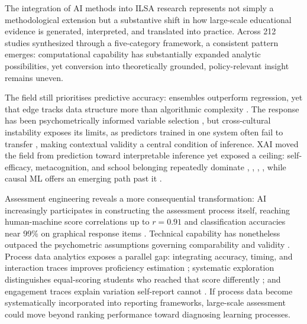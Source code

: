 \documentclass{ieeeaccess}
\begin{document}
The integration of AI methods into ILSA research represents not simply a methodological extension but a substantive shift in how large-scale educational evidence is generated, interpreted, and translated into practice. Across 212 studies synthesized through a five-category framework, a consistent pattern emerges: computational capability has substantially expanded analytic possibilities, yet conversion into theoretically grounded, policy-relevant insight remains uneven.

The field still prioritises predictive accuracy: ensembles outperform regression, yet that edge tracks data structure more than algorithmic complexity \cite{bezek-gure-etal2020, demir-karaboga2021, oz-etal2024, song-cutumisu2024}. The response has been psychometrically informed variable selection \cite{soares2024, mcjames-etal2024, koo-yoo2025}, but cross-cultural instability exposes its limits, as predictors trained in one system often fail to transfer \cite{wan-etal2025, zhang-cutumisu2024}, making contextual validity a central condition of inference. XAI moved the field from prediction toward interpretable inference yet exposed a ceiling: self-efficacy, metacognition, and school belonging repeatedly dominate \cite{zhai-etal2024}, \cite{huang-etal2024}, \cite{bernardo-etal2021}, \cite{bernardo-etal2023}, while causal ML offers an emerging path past it \cite{khine-etal2025, mcjames-etal2024}.

Assessment engineering reveals a more consequential transformation: AI increasingly participates in constructing the assessment process itself, reaching human-machine score correlations up to $r = 0.91$ and classification accuracies near 99\% on graphical response items \cite{jung-etal2022, jung-etal2024, tyack-etal2024, ripollyschmitz-etal2025}. Technical capability has nonetheless outpaced the psychometric assumptions governing comparability and validity \cite{peters-etal2025, peters-etal2025a, rausch-etal2024}. Process data analytics exposes a parallel gap: integrating accuracy, timing, and interaction traces improves proficiency estimation \cite{zhang-etal2023, liang-etal2023, costa-etal2021}; systematic exploration distinguishes equal-scoring students who reached that score differently \cite{teig2023, fn-aydin-etal2025}; and engagement traces explain variation self-report cannot \cite{shin-etal2024, ding-etal2025}. If process data become systematically incorporated into reporting frameworks, large-scale assessment could move beyond ranking performance toward diagnosing learning processes.
\end{document}
